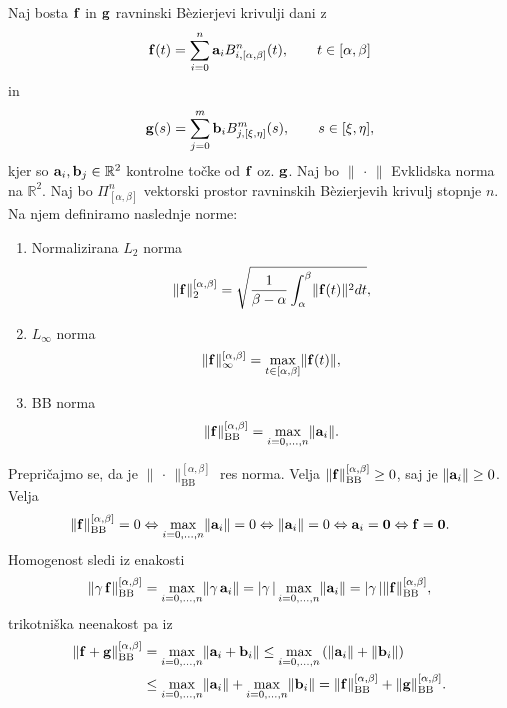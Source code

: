 \documentclass[12pt,a4paper, reqno]{amsart}
\def\R{\mathbb R}
\begin{document}
Naj bosta ${\bf f}$ in ${\bf g}$ ravninski B\`{e}zierjevi krivulji dani z 
$${\bf f}(t) = \sum _{i=0}^{n} {\bf a}_i B_{i,[\alpha,\beta]}^n(t), \qquad t\in[\alpha,\beta]$$
in
$${\bf g}(s) = \sum _{j=0}^{m} {\bf b}_i B_{j,[\xi,\eta]}^m(s), \qquad s\in[\xi,\eta],$$
kjer so ${\bf a}_i, {\bf b}_j \in \R ^2$ kontrolne točke od ${\bf f}$ oz. ${\bf g}$. Naj bo $\lVert \,\cdot\,\rVert$ Evklidska norma na $\R^2$. Naj bo $\Pi _{[\alpha,\beta]}^n$ vektorski prostor ravninskih B\`{e}zierjevih krivulj stopnje $n$. Na njem definiramo naslednje norme:
\begin{enumerate}
\item Normalizirana $L_2$ norma
$$
\lVert {\bf f} \rVert _2^{[\alpha,\beta]} = \sqrt{\frac{1}{\beta -\alpha}\int _{\alpha}^{\beta}\lVert {\bf f}(t)\rVert ^2 dt},
$$
\item $L_{\infty}$ norma
$$
\lVert {\bf f} \rVert _\infty^{[\alpha,\beta]} = \max _{t\in[\alpha,\beta]} \lVert {\bf f}(t)\rVert,
$$
\item BB norma
$$
\lVert {\bf f} \rVert _{\text{BB}}^{[\alpha,\beta]} = \max _{i=0,\ldots,n} \lVert {\bf a}_i\rVert.
$$
\end{enumerate}
Prepričajmo se, da je $\lVert \,\cdot\, \rVert _{\text{BB}}^{[\alpha,\beta]}$ res norma. Velja $\lVert {\bf f} \rVert _{\text{BB}}^{[\alpha,\beta]} \geq 0$, saj je $\lVert {\bf a}_i\rVert \geq 0$. Velja 
\begin{equation*}
\lVert {\bf f} \rVert _{\text{BB}}^{[\alpha,\beta]} = 0  \Leftrightarrow 
\max _{i=0,\ldots,n} \lVert {\bf a}_i\rVert = 0 
 \Leftrightarrow \lVert {\bf a}_i\rVert = 0 \Leftrightarrow {\bf a}_i = {\bf 0 }
 \Leftrightarrow {\bf f} = {\bf 0}.
\end{equation*}
Homogenost sledi iz enakosti 
\begin{equation*}
\lVert \gamma\, {\bf f} \rVert _{\text{BB}}^{[\alpha,\beta]}  = 
\max _{i=0,\ldots,n} \lVert \gamma\, {\bf a}_i\rVert = 
 |\gamma\, | \max _{i=0,\ldots,n}  \lVert {\bf a}_i\rVert = 
 |\gamma\,| \lVert {\bf f} \rVert _{\text{BB}}^{[\alpha,\beta]},
\end{equation*}
trikotniška neenakost pa iz 
\begin{equation*}
\begin{split}
\lVert {\bf f} + {\bf g} \rVert _{\text{BB}}^{[\alpha,\beta]} &= 
\max _{i=0,\ldots,n} \lVert {\bf a}_i + {\bf b}_i \rVert 
\leq \max _{i=0,\ldots,n} \left ( \lVert {\bf a}_i\rVert + \lVert {\bf b}_i \rVert\right ) \\
& \leq \max _{i=0,\ldots,n} \lVert {\bf a}_i\rVert + 
\max _{i=0,\ldots,n} \lVert {\bf b}_i \rVert = 
\lVert {\bf f} \rVert _{\text{BB}}^{[\alpha,\beta]} +
\lVert {\bf g} \rVert _{\text{BB}}^{[\alpha,\beta]}.
\end{split}
\end{equation*}
\end{document}
